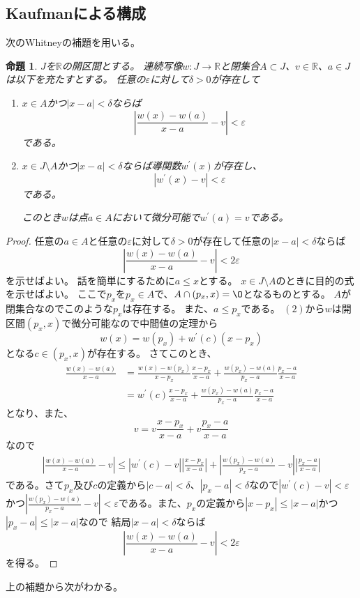 \documentclass[leqno]{jsarticle}
\newtheorem{prop}[thm]{命題}
\newcommand{\rr}{\mathbb{R}}
\newcommand{\ep}{\varepsilon}
\begin{document}
\subsection{Kaufmanによる構成}
次のWhitneyの補題を用いる。
\begin{prop}
$J$を$\rr$の開区間とする。
連続写像$w:J\to \rr$と閉集合$A\subset J$、$v\in \rr$、$a\in J$は以下を充たすとする。
任意の$\ep$に対して$\delta>0$が存在して
\begin{enumerate}
\item $x\in A$かつ$|x-a|<\delta$ならば
\[
\left|\frac{w(x)-w(a)}{x-a}-v\right|<\ep
\]
である。
\item $x\in J\setminus A$かつ$|x-a|<\delta$ならば導関数$w^{\prime}(x)$が存在し、
\[
|w^{\prime}(x)-v|<\ep
\]
である。
\par
このとき$w$は点$a\in A$において微分可能で$w^{\prime}(a)=v$である。
\end{enumerate}
\end{prop}
\begin{proof}
任意の$a\in A$と任意の$\ep$に対して$\delta>0$が存在して任意の$|x-a|<\delta$ならば
\[
\left|\frac{w(x)-w(a)}{x-a}-v\right|<2\ep
\]
を示せばよい。
話を簡単にするために$a\le x$とする。
$x\in J\setminus A$のときに目的の式を示せばよい。
ここで$p_x$を$p_x\in A$で、$A\cap (p_x, x)=\O$となるものとする。
$A$が閉集合なのでこのような$p_x$は存在する。
また、$a\le p_x$である。
$(2)$から$w$は開区間$(p_x, x)$で微分可能なので中間値の定理から
\[
w(x)=w(p_x)+w^{\prime}(c)(x-p_x)
\]
となる$c\in (p_x, x)$が存在する。
さてこのとき、
\begin{align*}
\frac{w(x)-w(a)}{x-a}
&=
\frac{w(x)-w(p_x)}{x-p_x}\frac{x-p_x}{x-a}+\frac{w(p_x)-w(a)}{p_x-a}\frac{p_x-a}{x-a}\\
&=
w^{\prime}(c)\frac{x-p_x}{x-a}+\frac{w(p_x)-w(a)}{p_x-a}\frac{p_x-a}{x-a}
\end{align*}
となり、また、
\[
v=v\frac{x-p_x}{x-a}+v\frac{p_x-a}{x-a}
\]
なので
\begin{align*}
\left|\frac{w(x)-w(a)}{x-a}-v \right|
\le
|w^{\prime}(c)-v|\left|\frac{x-p_x}{x-a}\right| +\left|\frac{w(p_x)-w(a)}{p_x-a}-v\right|\left|\frac{p_x-a}{x-a}\right|
\end{align*}
である。さて$p_x$及び$c$の定義から$|c-a|<\delta$、$|p_x-a|<\delta$なので$|w^{\prime}(c)-v|<\ep$かつ$\left|\frac{w(p_x)-w(a)}{p_x-a}-v\right|<\ep$である。また、$p_x$の定義から$|x-p_x|\le |x-a|$かつ$|p_x-a|\le |x-a|$なので
結局$|x-a|<\delta$ならば
\[
\left|\frac{w(x)-w(a)}{x-a}-v \right|<2\ep
\]
を得る。
\end{proof}
上の補題から次がわかる。
\end{document}
